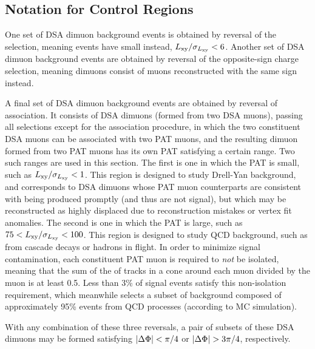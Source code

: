\subsection{Notation for Control Regions}
One set of DSA dimuon background events is obtained by reversal of the \LxySig selection, meaning events have small \LxySig instead, \eg $L_{\mathrm{xy}}/\sigma_{L_{\mathrm{xy}}} < 6$.
Another set of DSA dimuon background events are obtained by reversal of the opposite-sign charge selection, meaning dimuons consist of muons reconstructed with the same sign instead.

A final set of DSA dimuon background events are obtained by reversal of \DSAToPAT association.
It consists of DSA dimuons (formed from two DSA muons), passing all selections except for the \DSAToPAT association procedure, in which the two constituent DSA muons can be associated with two PAT muons, and the resulting dimuon formed from two PAT muons has its own PAT \LxySig satisfying a certain range.
Two such ranges are used in this section.
The first is one in which the PAT \LxySig is small, such as $L_{\mathrm{xy}}/\sigma_{L_{\mathrm{xy}}} < 1$. This region is designed to study Drell-Yan background, and corresponds to DSA dimuons whose PAT muon counterparts are consistent with being produced promptly (and thus are not signal), but which may be reconstructed as highly displaced due to reconstruction mistakes or vertex fit anomalies.
The second is one in which the PAT \LxySig is large, such as \mbox{$75 < L_{\mathrm{xy}}/\sigma_{L_{\mathrm{xy}}} < 100$}. This region is designed to study QCD background, such as from cascade decays or hadrons in flight.
In order to minimize signal contamination, each constituent PAT muon is required to \emph{not} be isolated, meaning that the sum of the \pT of tracks in a \DeltaR cone around each muon divided by the muon \pT is at least 0.5.
Less than 3\% of \twoMu signal events satisfy this non-isolation requirement, which meanwhile selects a subset of background composed of approximately 95\% events from QCD processes (according to MC simulation).

With any combination of these three reversals, a pair of subsets of these DSA dimuons may be formed satisfying $|\Delta\Phi| < \pi/4$ or $|\Delta\Phi| > 3\pi/4$, respectively.

